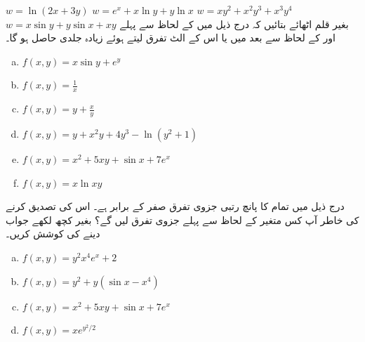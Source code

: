 $w=\ln(2x+3y)$
$w=e^x+x\ln y+y\ln x$
$w=xy^2+x^2y^3+x^3y^4$
$w=x\sin y+y\sin x+xy$
بغیر قلم اٹھائے   بتائیں کہ درج ذیل میں  کے لحاظ سے پہلے اور  کے  لحاظ سے بعد میں یا اس کے الٹ تفرق لیتے  ہوئے   زیادہ جلدی حاصل ہو گا۔
\begin{enumerate}[a.]
\item
$f(x,y)=x\sin y+e^y$
\item
$f(x,y)=\frac{1}{x}$
\item
$f(x,y)=y+\frac{x}{y}$
\item
$f(x,y)=y+x^2y+4y^3-\ln(y^2+1)$
\item
$f(x,y)=x^2+5xy+\sin x+7e^x$
\item
$f(x,y)=x\ln xy$
\end{enumerate}
درج ذیل میں تمام کا پانچ رتبی جزوی تفرق  صفر کے برابر ہے۔ اس کی تصدیق کرنے کی خاطر آپ کس متغیر کے لحاظ سے پہلے جزوی تفرق لیں گے؟ بغیر کچھ لکھے جواب دینے کی کوشش کریں۔
\begin{enumerate}[a.]
\item
$f(x,y)=y^2x^4e^x+2$
\item
$f(x,y)=y^2+y(\sin x-x^4)$
\item
$f(x,y)=x^2+5xy+\sin x+7e^x$
\item
$f(x,y)=xe^{y^2/2}$
\end{enumerate}

